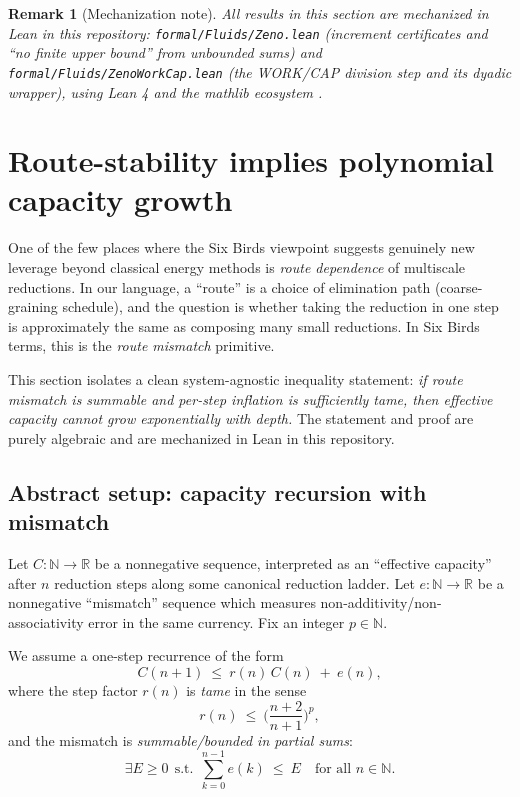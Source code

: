\documentclass[11pt]{article}
\newcommand{\R}{\mathbb{R}}
\newcommand{\N}{\mathbb{N}}
\newtheorem{remark}{Remark}
\begin{document}
\begin{remark}[Mechanization note]
All results in this section are mechanized in Lean in this repository:
\texttt{formal/Fluids/Zeno.lean} (increment certificates and ``no finite upper bound'' from unbounded sums)
and \texttt{formal/Fluids/ZenoWorkCap.lean} (the WORK/CAP division step and its dyadic wrapper), using Lean 4 and the mathlib ecosystem \citep{lean4,demoura2015lean,mathlib2020}.
\end{remark}
 \section{Route-stability implies polynomial capacity growth}\label{sec:route-capacity}

One of the few places where the Six Birds viewpoint suggests genuinely new leverage beyond
classical energy methods is \emph{route dependence} of multiscale reductions.
In our language, a ``route'' is a choice of elimination path (coarse-graining schedule),
and the question is whether taking the reduction in one step is approximately the same as composing
many small reductions. In Six Birds terms, this is the \emph{route mismatch} primitive.

This section isolates a clean system-agnostic inequality statement:
\emph{if route mismatch is summable and per-step inflation is sufficiently tame,
then effective capacity cannot grow exponentially with depth.}
The statement and proof are purely algebraic and are mechanized in Lean in this repository.

\subsection{Abstract setup: capacity recursion with mismatch}

Let $C:\N\to\R$ be a nonnegative sequence, interpreted as an ``effective capacity'' after $n$
reduction steps along some canonical reduction ladder. Let $e:\N\to\R$ be a nonnegative ``mismatch''
sequence which measures non-additivity/non-associativity error in the same currency.
Fix an integer $p\in\N$.

We assume a one-step recurrence of the form
\begin{equation}\label{eq:route-rec}
C(n+1)\ \le\ r(n)\,C(n)\ +\ e(n),
\end{equation}
where the step factor $r(n)$ is \emph{tame} in the sense
\begin{equation}\label{eq:r-tame}
r(n)\ \le\ \Big(\frac{n+2}{n+1}\Big)^p,
\end{equation}
and the mismatch is \emph{summable/bounded in partial sums}:
\begin{equation}\label{eq:e-bounded}
\exists E\ge 0\ \ \text{s.t.}\ \ \sum_{k=0}^{n-1} e(k)\ \le\ E\quad\text{for all }n\in\N.
\end{equation}
\end{document}
